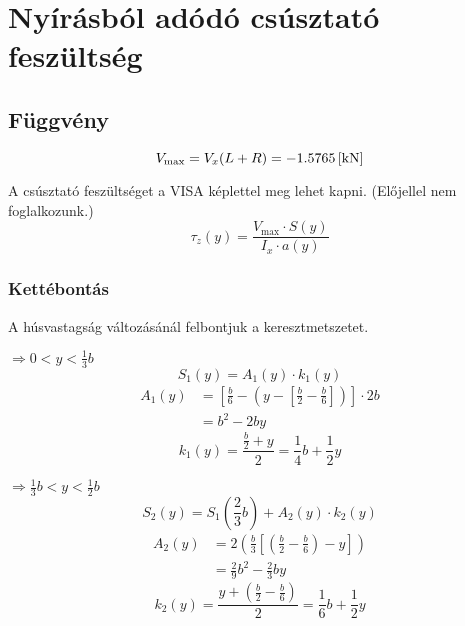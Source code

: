\section{Nyírásból adódó csúsztató feszültség}

\subsection{Függvény}

\begin{equation*}
	V_\text{max} = V_x (L+R) = \SI{-1.5765}{[\kilo\newton]}
\end{equation*}

A csúsztató feszültséget a VISA képlettel meg lehet kapni. (Előjellel nem foglalkozunk.)
\begin{equation*}
	\tau_z(y) = \frac{V_\text{max} \cdot S(y)}{I_x \cdot a(y)}
\end{equation*}

\subsubsection{Kettébontás}
A húsvastagság változásánál felbontjuk a keresztmetszetet.

\begin{multicols}{2}
	 $\Rightarrow 0 < y < \frac{1}{3}b$
	\begin{equation*}
		S_1(y) = A_1(y) \cdot k_1(y)
	\end{equation*}
	\begin{align*}
		A_1(y) &= \left[ 
			\frac{b}{6} 
			- \left(y - \left[\frac{b}{2} - \frac{b}{6} \right] \right)
		\right] \cdot 2b
		\\&= b^2 -2by
	\end{align*}
	\begin{equation*}
		k_1(y) = \frac{\frac{b}{2} + y}{2} = \frac{1}{4}b+\frac{1}{2}y
	\end{equation*}

	\columnbreak
	 $\Rightarrow \frac{1}{3}b < y < \frac{1}{2}b$
	\begin{equation*}
		S_2(y) = S_1\left(\frac{2}{3}b\right) + A_2(y) \cdot k_2(y)
	\end{equation*}
	\begin{align*}
		A_2(y) &= 2\left(\frac{b}{3} \left[\left(\frac{b}{2} - \frac{b}{6}\right) - y \right] \right)
		     \\&=\frac{2}{9}b^2 - \frac{2}{3}by
	\end{align*}
	\begin{equation*}
		k_2(y) = \frac{y + \left(\frac{b}{2} - \frac{b}{6} \right)}{2}
		= \frac{1}{6}b + \frac{1}{2}y
	\end{equation*}

\end{multicols}

